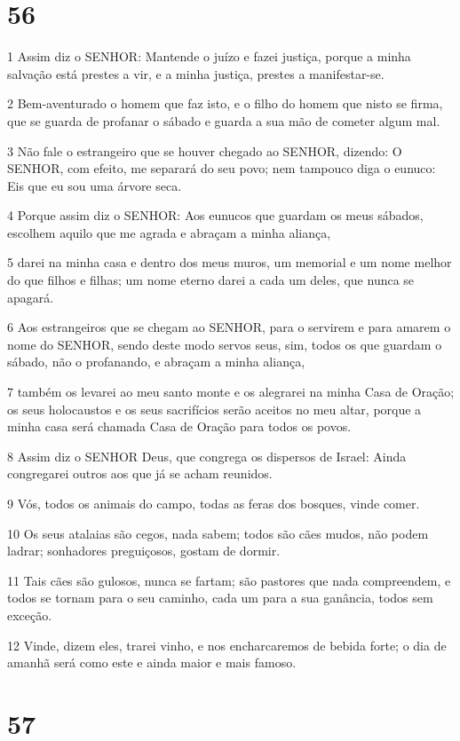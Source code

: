 \chapter{56}

\par 1 Assim diz o SENHOR: Mantende o juízo e fazei justiça, porque a minha salvação está prestes a vir, e a minha justiça, prestes a manifestar-se.
\par 2 Bem-aventurado o homem que faz isto, e o filho do homem que nisto se firma, que se guarda de profanar o sábado e guarda a sua mão de cometer algum mal.
\par 3 Não fale o estrangeiro que se houver chegado ao SENHOR, dizendo: O SENHOR, com efeito, me separará do seu povo; nem tampouco diga o eunuco: Eis que eu sou uma árvore seca.
\par 4 Porque assim diz o SENHOR: Aos eunucos que guardam os meus sábados, escolhem aquilo que me agrada e abraçam a minha aliança,
\par 5 darei na minha casa e dentro dos meus muros, um memorial e um nome melhor do que filhos e filhas; um nome eterno darei a cada um deles, que nunca se apagará.
\par 6 Aos estrangeiros que se chegam ao SENHOR, para o servirem e para amarem o nome do SENHOR, sendo deste modo servos seus, sim, todos os que guardam o sábado, não o profanando, e abraçam a minha aliança,
\par 7 também os levarei ao meu santo monte e os alegrarei na minha Casa de Oração; os seus holocaustos e os seus sacrifícios serão aceitos no meu altar, porque a minha casa será chamada Casa de Oração para todos os povos.
\par 8 Assim diz o SENHOR Deus, que congrega os dispersos de Israel: Ainda congregarei outros aos que já se acham reunidos.
\par 9 Vós, todos os animais do campo, todas as feras dos bosques, vinde comer.
\par 10 Os seus atalaias são cegos, nada sabem; todos são cães mudos, não podem ladrar; sonhadores preguiçosos, gostam de dormir.
\par 11 Tais cães são gulosos, nunca se fartam; são pastores que nada compreendem, e todos se tornam para o seu caminho, cada um para a sua ganância, todos sem exceção.
\par 12 Vinde, dizem eles, trarei vinho, e nos encharcaremos de bebida forte; o dia de amanhã será como este e ainda maior e mais famoso.

\chapter{57}

